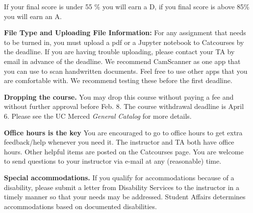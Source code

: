 \documentclass{article}
\newcommand{\secskip}{\vspace{6pt}}
\begin{document}
If your final score is under 55 \% you will earn a D, if you final score is above 85\% you will earn an A.

%
%
%

\secskip
\textbf{File Type and Uploading File Information:} 
For any assignment that needs to be turned in, you must upload a pdf  or a Jupyter notebook to Catcourses by the deadline. If you are having trouble uploading, please contact your TA by email in advance of the deadline. We recommend CamScanner as one app that you can use to scan handwritten documents. Feel free to use other apps that you are comfortable with. We recommend testing these before the first deadline. 
 \secskip

\textbf{Dropping the course.} You may drop this course without paying a fee
and without further approval before Feb. 8. The course withdrawal deadline is April 6. Please see the UC Merced \textit{General Catalog} for more details.

\secskip

\textbf{Office hours is the key} You are encouraged to go to office hours to get extra feedback/help whenever you
need it. The instructor and TA both have office hours. Other helpful items are posted on the Catcourses page. You are welcome to send questions to your instructor via e-mail at any (reasonable) time.

\secskip

\textbf{Special accommodations.} If you qualify for accommodations
because of a disability, please submit a letter from Disability
Services to the instructor in a timely manner so that your needs may
be addressed.  Student Affairs determines accommodations based on
documented disabilities.
\end{document}
